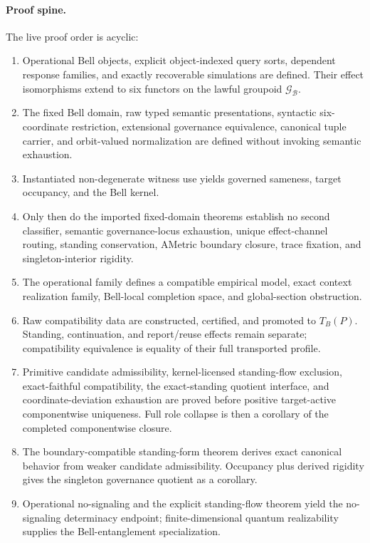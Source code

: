 \documentclass[11pt]{article}
\theoremstyle{definition}
\newcommand{\Bell}{\mathcal{B}}
\newcommand{\BellLaw}{\mathscr{G}_{\Bell}}
\begin{document}
\paragraph{Proof spine.}
The live proof order is acyclic:
\begin{enumerate}[label=(\arabic*),leftmargin=2.2em]
\item Operational Bell objects, explicit object-indexed query sorts, dependent response families, and exactly recoverable simulations are defined. Their effect isomorphisms extend to six functors on the lawful groupoid $\BellLaw$.
\item The fixed Bell domain, raw typed semantic presentations, syntactic six-coordinate restriction, extensional governance equivalence, canonical tuple carrier, and orbit-valued normalization are defined without invoking semantic exhaustion.
\item Instantiated non-degenerate witness use yields governed sameness, target occupancy, and the Bell kernel.
\item Only then do the imported fixed-domain theorems establish no second classifier, semantic governance-locus exhaustion, unique effect-channel routing, standing conservation, AMetric boundary closure, trace fixation, and singleton-interior rigidity.
\item The operational family defines a compatible empirical model, exact context realization family, Bell-local completion space, and global-section obstruction.
\item Raw compatibility data are constructed, certified, and promoted to $T_B(P)$. Standing, continuation, and report/reuse effects remain separate; compatibility equivalence is equality of their full transported profile.
\item Primitive candidate admissibility, kernel-licensed standing-flow exclusion, exact-faithful compatibility, the exact-standing quotient interface, and coordinate-deviation exhaustion are proved before positive target-active componentwise uniqueness. Full role collapse is then a corollary of the completed componentwise closure.
\item The boundary-compatible standing-form theorem derives exact canonical behavior from weaker candidate admissibility. Occupancy plus derived rigidity gives the singleton governance quotient as a corollary.
\item Operational no-signaling and the explicit standing-flow theorem yield the no-signaling determinacy endpoint; finite-dimensional quantum realizability supplies the Bell-entanglement specialization.
\end{enumerate}
\end{document}
